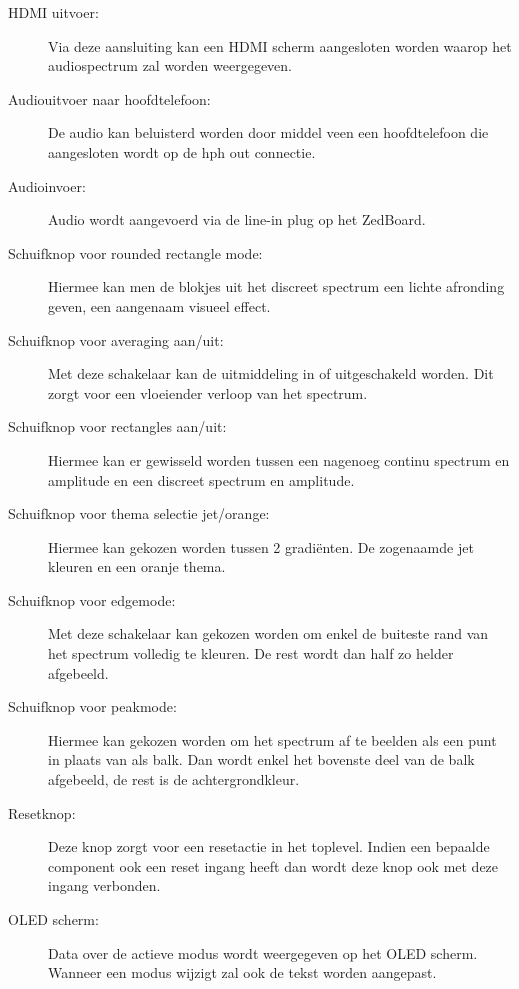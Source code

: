 \newpage
	\begin{description}
		\item [HDMI uitvoer:] Via deze aansluiting kan een HDMI scherm aangesloten worden waarop het audiospectrum zal worden weergegeven. \rbrack 
		
		\item [Audiouitvoer naar hoofdtelefoon:] De audio kan beluisterd worden door middel veen een hoofdtelefoon die aangesloten wordt op de hph out connectie. \rbrack
		
		\item [Audioinvoer:] Audio wordt aangevoerd via de line-in plug op het ZedBoard. \rbrack
		
		\item [Schuifknop voor rounded rectangle mode:] Hiermee kan men de blokjes uit het discreet spectrum een lichte afronding geven, een aangenaam visueel effect. \rbrack
		
		\item [Schuifknop voor averaging aan/uit:] Met deze schakelaar kan de uitmiddeling in of uitgeschakeld worden. Dit zorgt voor een vloeiender verloop van het spectrum. \rbrack
		
		\item [Schuifknop voor rectangles aan/uit:] Hiermee kan er gewisseld worden tussen een nagenoeg continu spectrum en amplitude en een discreet spectrum en amplitude.\rbrack
		
		\item [Schuifknop voor thema selectie jet/orange:] Hiermee kan gekozen worden tussen 2 gradi\"enten. De zogenaamde jet kleuren en een oranje thema.\rbrack
		
		\item [Schuifknop voor edgemode:] Met deze schakelaar kan gekozen worden om enkel de buiteste rand van het spectrum volledig te kleuren. De rest wordt dan half zo helder afgebeeld.\rbrack
		
		\item [Schuifknop voor peakmode:] Hiermee kan gekozen worden om het spectrum af te beelden als een punt in plaats van als balk. Dan wordt enkel het bovenste deel van de balk afgebeeld, de rest is de achtergrondkleur.\rbrack
		
		\item [Resetknop:] Deze knop zorgt voor een resetactie in het toplevel. Indien een bepaalde component ook een reset ingang heeft dan wordt deze knop ook met deze ingang verbonden.\rbrack
		
		\item [OLED scherm:] Data over de actieve modus wordt weergegeven op het OLED scherm. Wanneer een modus wijzigt zal ook de tekst worden aangepast. \rbrack
	\end{description}	

